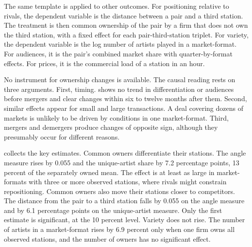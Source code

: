 The same template is applied to other outcomes. For positioning relative to rivals, the dependent variable is the
distance between a pair and a third station. The treatment is then common ownership of the pair by a firm that does not
own the third station, with a fixed effect for each pair-third-station triplet. For variety, the dependent
variable is the log number of artists played in a market-format. For audiences, it is the pair's combined market share
with quarter-by-format effects. For prices, it is the commercial load of a station in an hour.

No instrument for ownership changes is available. The causal reading rests on three arguments. First, timing.
 shows no trend in differentiation or audiences before mergers and clear changes within six to
twelve months after them. Second, similar effects appear for small and large transactions. A deal covering dozens of
markets is unlikely to be driven by conditions in one market-format. Third, mergers and demergers produce changes of
opposite sign, although they presumably occur for different reasons.

 collects the key estimates. Common owners differentiate their stations. The angle measure
rises by 0.055 and the unique-artist share by 7.2 percentage points, 13 percent of the separately owned mean. The
effect is at least as large in market-formats with three or more observed stations, where rivals might constrain
repositioning. Common owners also move their stations closer to competitors. The distance from the pair to a third
station falls by 0.055 on the angle measure and by 6.1 percentage points on the unique-artist measure. Only the first
estimate is significant, at the 10 percent level. Variety does not rise. The number of artists in a market-format rises
by 6.9 percent only when one firm owns all observed stations, and the number of owners has no significant effect.

